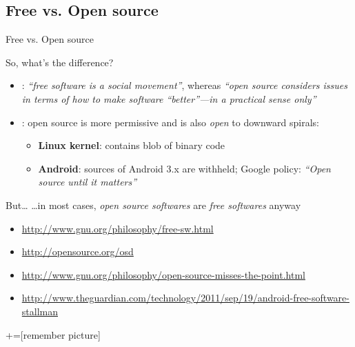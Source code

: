 \documentclass[10pt,xcolor=svgnames]{beamer}
\begin{document}
\subsection{Free vs. Open source}
\begin{frame}{Free vs. Open source}

  \begin{block}{So, what's the difference?}
    \begin{itemize}
      \item {}: \emph{``free software is a social movement''}, whereas \emph{``open source considers issues in terms of how to make software “better”—in a practical sense only''}
      \item {}: open source is more permissive and is also \emph{open} to downward spirals:
        \begin{itemize}
          \item \textbf{Linux kernel}: contains blob of binary code
          \item \textbf{Android}: sources of Android 3.x are withheld; Google policy: \emph{``Open source until it matters''}
        \end{itemize}
    \end{itemize}
  \end{block}

  \begin{block}{But\ldots}
    \ldots in most cases, \emph{open source softwares} are \emph{free softwares} anyway
  \end{block}

  \vspace{1em}
  {\scriptsize
    \begin{itemize}
    \item \url{http://www.gnu.org/philosophy/free-sw.html}
    \item \url{http://opensource.org/osd}
    \item \url{http://www.gnu.org/philosophy/open-source-misses-the-point.html}
    \item \url{http://www.theguardian.com/technology/2011/sep/19/android-free-software-stallman}
    \end{itemize}
  }
\end{frame}

+=[remember picture]
\end{document}
